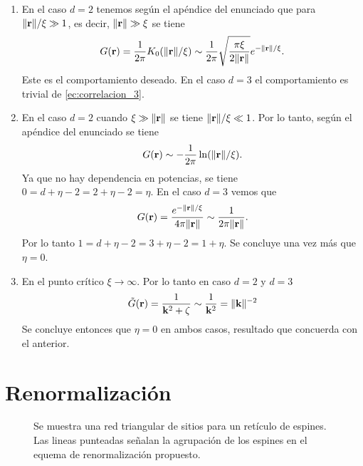 \documentclass{article}
\begin{document}
\begin{enumerate}
\item En el caso $d=2$ tenemos según el apéndice del enunciado que para $\|\vb{r}\|/\xi\gg 1$, es decir, $\|\vb{r}\|\gg \xi$ se tiene
\begin{equation}
G(\vb{r})=\frac{1}{2\pi}K_0(\|\vb{r}\|/\xi)\sim\frac{1}{2\pi}\sqrt{\frac{\pi\xi}{2\|\vb{r}\|}}e^{-\|\vb{r}\|/\xi}.
\end{equation}
Este es el comportamiento deseado. En el caso $d=3$ el comportamiento es trivial de \eqref{ec:correlacion_3}.

\item En el caso $d=2$ cuando $\xi\gg\|\vb{r}\|$ se tiene $\|\vb{r}\|/\xi\ll 1$. Por lo tanto, según el apéndice del enunciado se tiene
\begin{equation}
G(\vb{r})\sim-\frac{1}{2\pi}\ln(\|\vb{r}\|/\xi).
\end{equation}
Ya que no hay dependencia en potencias, se tiene $0=d+\eta-2=2+\eta-2=\eta$. En el caso $d=3$ vemos que 
\begin{equation}
G(\vb{r})=\frac{e^{-\|\vb{r}\|/\xi}}{4\pi\|\vb{r}\|}\sim\frac{1}{2\pi\|\vb{r}\|}.
\end{equation}
Por lo tanto $1=d+\eta-2=3+\eta-2=1+\eta$. Se concluye una vez más que $\eta=0$.

\item En el punto crítico $\xi\rightarrow\infty$. Por lo tanto en caso $d=2$ y $d=3$
\begin{equation}
\tilde{G}(\vb{r})=\frac{1}{\vb{k}^2+\zeta}\sim\frac{1}{\vb{k}^2}=\|\vb{k}\|^{-2}
\end{equation}
Se concluye entonces que $\eta=0$ en ambos casos, resultado que concuerda con el anterior.

\end{enumerate}

\section{Renormalización}

\begin{figure}[h]
\begin{center}
\end{center}
\caption{\label{fig:red}Se muestra una red triangular de sitios para un retículo de espines. Las lineas punteadas señalan la agrupación de los espines en el equema de renormalización propuesto.}
\end{figure}
\end{document}

